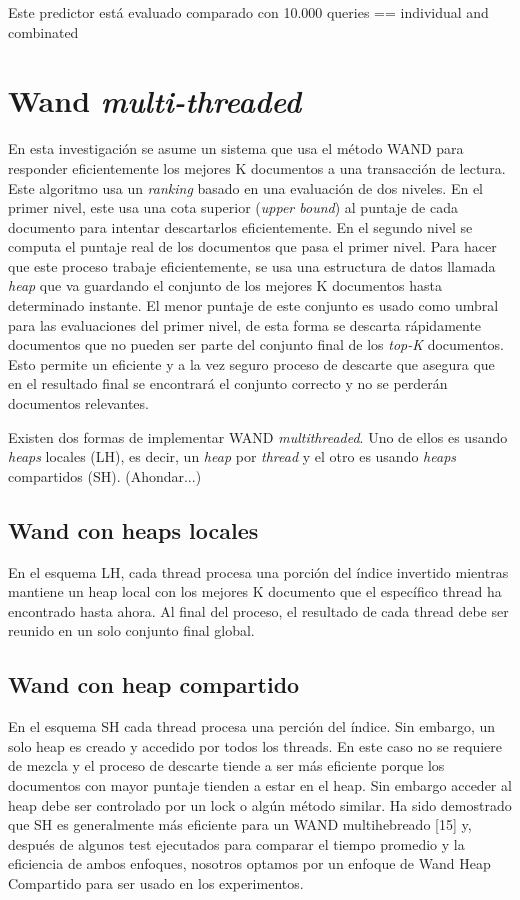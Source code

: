 Este predictor está evaluado comparado con 10.000 queries == individual and combinated


\section{Wand \textit{multi-threaded}}
\label{scheduling:wm}
En esta investigación se asume un sistema que usa el método WAND \citep{Broder:2003} para responder eficientemente los mejores K documentos a una transacción de lectura. Este algoritmo usa un \textit{ranking} basado en una evaluación de dos niveles. En el primer nivel, este usa una cota superior (\textit{upper bound}) al puntaje de cada documento para intentar descartarlos eficientemente. En el segundo nivel se computa el puntaje real de los documentos que pasa el primer nivel. Para hacer que este proceso trabaje eficientemente, se usa una estructura de datos llamada \textit{heap} que va guardando el conjunto de los mejores K documentos hasta determinado instante. El menor puntaje de este conjunto es usado como umbral para las evaluaciones del primer nivel, de esta forma se descarta rápidamente documentos que no pueden ser parte del conjunto final de los \textit{top-K} documentos. Esto permite un eficiente y a la vez seguro proceso de descarte que asegura que en el resultado final se encontrará el conjunto correcto y no se perderán documentos relevantes.

Existen dos formas de implementar WAND \textit{multithreaded}. Uno de ellos es usando \textit{heaps} locales (LH), es decir, un \textit{heap} por \textit{thread} y el otro es usando \textit{heaps} compartidos (SH). (Ahondar...)

\subsection{Wand con heaps locales}
\label{scheduling:whl}
En el esquema LH, cada thread procesa una porción del índice invertido mientras mantiene un heap local con los mejores K documento que el específico thread ha encontrado hasta ahora. Al final del proceso, el resultado de cada thread debe ser reunido en un solo conjunto final global.


\subsection{Wand con heap compartido}
\label{scheduling:whc}
En el esquema SH cada thread procesa una perción del índice. Sin embargo, un solo heap es creado y accedido por todos los threads. En este caso no se requiere de mezcla y el proceso de descarte tiende a ser más eficiente porque los documentos con mayor puntaje tienden a estar en el heap. Sin embargo acceder al heap debe ser controlado por un lock o algún método similar. Ha sido demostrado que SH es generalmente más eficiente para un WAND multihebreado [15] y, después de algunos test ejecutados para comparar el tiempo promedio y la eficiencia de ambos enfoques, nosotros optamos por un enfoque de Wand Heap Compartido para ser usado en los experimentos.






